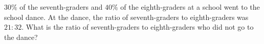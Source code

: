 $30\%$ of the seventh-graders and $40\%$ of the eighth-graders at a school went to the school dance. At the dance, the ratio of seventh-graders to eighth-graders was $21:32$. What is the ratio of seventh-graders to eighth-graders who did not go to the dance?

